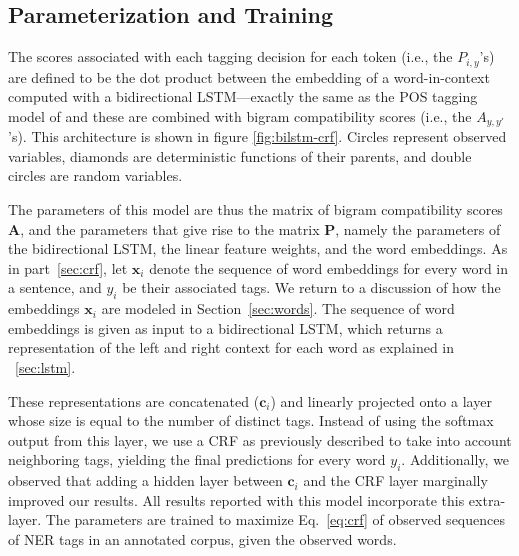 \documentclass[11pt,letterpaper]{article}
\begin{document}
\subsection{Parameterization and Training}
The scores associated with each tagging decision for each token (i.e., the $P_{i,y}$'s) are defined to be the dot product between the embedding of a word-in-context computed with a bidirectional LSTM---exactly the same as the POS tagging model of  and these are combined with bigram compatibility scores (i.e., the $A_{y,y'}$'s). This architecture is shown in figure \ref{fig:bilstm-crf}. Circles represent observed variables, diamonds are deterministic functions of their parents, and double circles are random variables.

The parameters of this model are thus the matrix of bigram compatibility scores $\mathbf{A}$, and the parameters that give rise to the matrix $\mathbf{P}$, namely the parameters of the bidirectional LSTM, the linear feature weights, and the word embeddings. As in part~\ref{sec:crf}, let $\mathbf{x}_i$ denote the sequence of word embeddings for every word in a sentence, and $y_i$ be their associated tags. We return to a discussion of how the embeddings $\mathbf{x}_i$ are modeled in Section~\ref{sec:words}. The sequence of word embeddings is given as input to a bidirectional LSTM, which returns a representation of the left and right context for each word as explained in ~\ref{sec:lstm}.

These representations are concatenated ($\mathbf{c}_i$) and linearly projected onto a layer whose size is equal to the number of distinct tags. Instead of using the softmax output from this layer, we use a CRF as previously described to take into account neighboring tags, yielding the final predictions for every word $y_i$. Additionally, we observed that adding a hidden layer between $\mathbf{c}_i$ and the CRF layer marginally  improved our results. All results reported with this model incorporate this extra-layer.  The parameters are trained to maximize Eq.~\ref{eq:crf} of observed sequences of NER tags in an annotated corpus, given the observed words.
\end{document}

